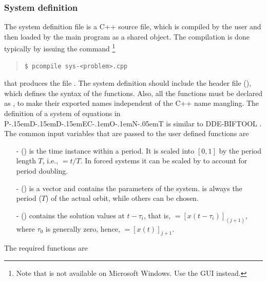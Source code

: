 \documentclass[10pt,a4paper]{ddedoc}
\def\pdde{{P\kern-.15emD\kern-.15emD\kern-.15emE\raisebox{.25ex}{-}C\kern-.1emO\kern-.1emN\kern-.05emT}}
\begin{document}
\subsubsection{System definition}\label{sysdef}

The system definition file is a C++ source file, which is compiled by the user
and then loaded by the main program  as a shared object. The
compilation is done typically by issuing the command%
\footnote{Note that  is not available on Microsoft Windows. Use the GUI instead.}
{ \small \begin{quote} \begin{lstlisting}[basicstyle=\tt,frame=single]
$ pcompile sys-<problem>.cpp
\end{lstlisting} \end{quote} } \noindent
that produces the file .
The system definition should include the header file 
(), which defines the syntax of the functions. Also, all
the functions must be declared as , to make their exported names
independent of the C++ name mangling. The definition of a system of equations in
\pdde{} is similar to DDE-BIFTOOL \cite{DDEBIF}. The common input variables that
are passed to the user defined functions are
\begin{itemize}
  \item[-]  () is the time instance within a period. It is
  scaled into $[ 0, 1 ]$ by the period length $T$, i.e., $ = t/T$. In forced systems
  it can be scaled by  to account for period doubling.
  \item[-]  () is a vector and contains the parameters of
  the system.  is always the period ($T$) of the actual orbit,
  while others can be chosen.
  \item[-]  () contains the solution values at $t -
  \tau_i$, that is, $= [ x ( t - \tau_i ) ]_{(j+1)}$, where
$\tau_0$ is generally zero, hence, $=[x(t)]_{j+1}$.
\end{itemize}
The required functions are
\end{document}
